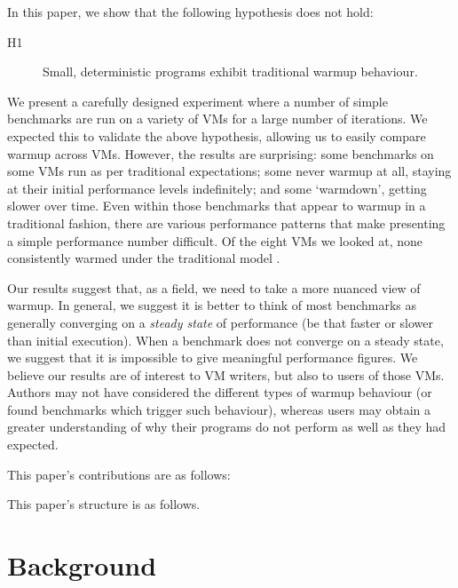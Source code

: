 \documentclass[10pt,preprint]{sigplanconf}
\newcommand{\hypone}{H1\xspace}
\begin{document}
In this paper, we show that the following hypothesis does not hold:
\begin{description}
  \item[\hypone] Small, deterministic programs exhibit traditional warmup behaviour.
\end{description}

We present a carefully designed
experiment where a number of simple benchmarks are run on a variety of
VMs for a large number of iterations. We expected this to validate the above
hypothesis, allowing us to easily compare warmup across VMs. However, the
results are surprising: some benchmarks on some VMs run as per traditional
expectations; some never warmup at all, staying at their initial performance
levels indefinitely; and some `warmdown', getting slower over time. Even within
those benchmarks that appear to warmup in a traditional fashion, there are
various performance patterns that make presenting a simple performance number
difficult. Of the eight VMs we looked at,
none consistently warmed under the traditional model .

Our results suggest that, as a field, we need to take a more nuanced view
of warmup. In general, we suggest it is better to think of most benchmarks as
generally converging on a \emph{steady state} of performance (be that faster or
slower than initial execution). When a benchmark does not converge on a steady
state, we suggest that it is impossible to give meaningful performance figures.
We believe our results are of interest to VM writers, but also to users of
those VMs. Authors may not have considered the different types of warmup
behaviour (or found benchmarks which trigger such behaviour), whereas users may
obtain a greater understanding of why their programs do not perform as well as
they had expected.

This paper's contributions are as follows:
\begin{enumerate*}
  \item {}
\end{enumerate*}

This paper's structure is as follows. 


\section{Background}
\label{sec:warmup}
\end{document}
